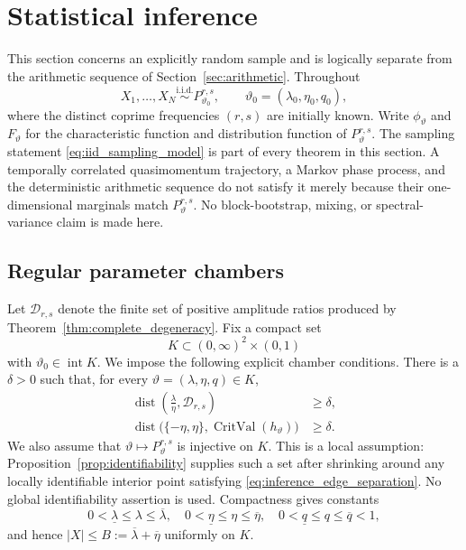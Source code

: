 \documentclass[11pt]{amsart}
\numberwithin{equation}{section}\setcounter{tocdepth}{3}\setcounter{secnumdepth}{3}
\begin{document}
\section{Statistical inference}\label{sec:inference}
This section concerns an explicitly random sample and is logically separate from the
arithmetic sequence of Section~\ref{sec:arithmetic}.  Throughout
\begin{equation}
 X_1,\ldots,X_N\overset{\mathrm{i.i.d.}}{\sim}P_{\vartheta_0}^{r,s},
 \qquad \vartheta_0=(\lambda_0,\eta_0,q_0),
 \label{eq:iid_sampling_model}
\end{equation}
where the distinct coprime frequencies $(r,s)$ are initially known.  Write
$\phi_\vartheta$ and $F_\vartheta$ for the characteristic function and distribution
function of $P_\vartheta^{r,s}$.
The sampling statement \eqref{eq:iid_sampling_model} is part of every theorem in this
section.  A temporally correlated quasimomentum trajectory, a Markov phase process, and
the deterministic arithmetic sequence do not satisfy it merely because their
one-dimensional marginals match $P_\vartheta^{r,s}$.  No block-bootstrap, mixing, or
spectral-variance claim is made here.

\subsection{Regular parameter chambers}\label{subsec:regular_chambers}
Let $\mathcal D_{r,s}$ denote the finite set of positive amplitude ratios produced by
Theorem~\ref{thm:complete_degeneracy}.  Fix a compact set
\begin{equation}
 K\subset(0,\infty)^2\times(0,1)
 \label{eq:inference_compact_set}
\end{equation}
with $\vartheta_0\in\operatorname{int}K$.  We impose the following explicit chamber
conditions.  There is a $\delta>0$ such that, for every
$\vartheta=(\lambda,\eta,q)\in K$,
\begin{align}
 \operatorname{dist}\left(\frac{\lambda}{\eta},\mathcal D_{r,s}\right)&\ge\delta,
 \label{eq:inference_ratio_separation}\\
 \operatorname{dist}\bigl(\{-\eta,\eta\},
             \operatorname{CritVal}(h_\vartheta)\bigr)&\ge\delta.
 \label{eq:inference_edge_separation}
\end{align}
We also assume that $\vartheta\mapsto P_\vartheta^{r,s}$ is injective on $K$.  This is a
local assumption: Proposition~\ref{prop:identifiability} supplies such a set after
shrinking around any locally identifiable interior point satisfying
\eqref{eq:inference_edge_separation}.  No global identifiability assertion is used.
Compactness gives constants
\begin{equation}
 0<\underline\lambda\le\lambda\le\overline\lambda,
 \quad 0<\underline\eta\le\eta\le\overline\eta,
 \quad 0<\underline q\le q\le\overline q<1,
 \label{eq:compact_parameter_bounds}
\end{equation}
and hence $|X|\le B:=\overline\lambda+\overline\eta$ uniformly on $K$.
\end{document}
